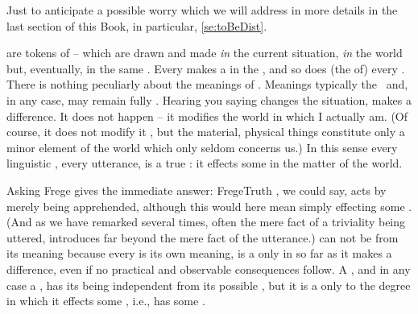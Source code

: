 
\pa Just to anticipate a possible worry which we will address in more details in
the last section of this Book, in particular, \ref{se:toBeDist}.

 are  tokens of  -- 
which are drawn and made {\em in} the current situation, {\em in} the world but,
eventually, in the same . Every  makes a
 in the , and so does (the  of) every
.  There is nothing peculiarly  about the meanings of
.
Meanings typically  the \hoa\ and, in any case, may remain fully
.  Hearing you saying 
changes the  situation, makes a difference. 
It does not happen  -- it
modifies the world in which I actually am. (Of course, it does not modify it
, but the material, physical things constitute only a minor
element of the world which only seldom concerns us.) In this sense every
linguistic , every utterance, is a true : it effects
some  in the matter of the world.

Asking  Frege gives the immediate answer: \citet{By
  being apprehended and taken to be true.}{FregeTruth}{\kilde{[p.104]}}
, we could say, acts by merely being apprehended, although this
would here mean simply effecting some . (And as we have remarked
several times, often the mere fact of a triviality being uttered, introduces
 far beyond the mere fact of the utterance.) 
can not be  from its meaning because every  is
its own meaning, is a  only in so far as it makes a difference,
even if no practical and observable consequences follow. A , and in any
case a , has its being independent from its possible
, but it is a  only to the degree in which it effects some
, i.e., has some .

